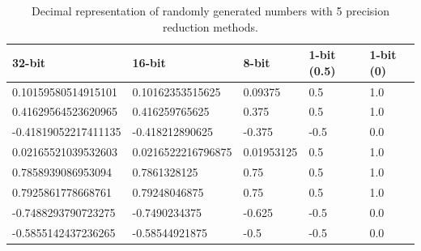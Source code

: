 \begin{table}[ht]
\center
\begin{tabular}{lllll}
    \toprule
    \hspace{1.3mm}\textbf{32-bit} & \hspace{1.3mm}\textbf{16-bit} & \hspace{1.3mm}\textbf{8-bit} & \hspace{1.3mm}\textbf{1-bit (0.5)} & \textbf{1-bit (0)} \\
    \midrule
    \hspace{1.3mm}0.10159580514915101 & \hspace{1.3mm}0.10162353515625 & \hspace{1.3mm}0.09375 & \hspace{1.3mm}0.5 & 1.0 \\
    \hspace{1.3mm}0.41629564523620965 & \hspace{1.3mm}0.416259765625 & \hspace{1.3mm}0.375 & \hspace{1.3mm}0.5 & 1.0 \\
    -0.41819052217411135 & -0.418212890625 & -0.375 & -0.5 & 0.0 \\
    \hspace{1.3mm}0.02165521039532603 & \hspace{1.3mm}0.0216522216796875\hspace{-5mm} & \hspace{1.3mm}0.01953125 & \hspace{1.3mm}0.5 & 1.0 \\
    \hspace{1.3mm}0.7858939086953094 & \hspace{1.3mm}0.7861328125 & \hspace{1.3mm}0.75 & \hspace{1.3mm}0.5 & 1.0 \\
    \hspace{1.3mm}0.7925861778668761 & \hspace{1.3mm}0.79248046875 & \hspace{1.3mm}0.75 & \hspace{1.3mm}0.5 & 1.0 \\
    -0.7488293790723275 & -0.7490234375 & -0.625 & -0.5 & 0.0 \\
    -0.5855142437236265 & -0.58544921875 & -0.5 & -0.5 & 0.0 \\
    \bottomrule
\end{tabular}
\caption{Decimal representation of randomly generated numbers with 5 precision reduction methods.}
\label{tab:prec_examples}
\end{table}


